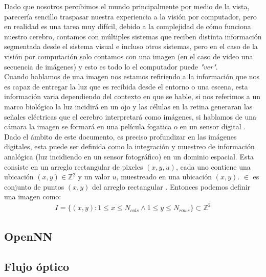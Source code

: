 \documentclass{iccmemoria}
\begin{document}
Dado que nosotros percibimos el mundo principalmente por medio de la vista, parecería sencillo traspasar nuestra experiencia a la visión por computador, pero en realidad es una tarea muy difícil, debido a la complejidad de cómo funciona nuestro cerebro, contamos con múltiples sistemas que reciben distinta información segmentada desde el sistema visual e incluso otros sistemas, pero en el caso de la visión por computación solo contamos con una imagen (en el caso de video una secuencia de imágenes) y esto es todo lo el computador puede \emph{"ver"}.\\

Cuando hablamos de una imagen nos estamos refiriendo a la información que nos es capaz de entregar la luz que es recibida desde el entorno o una escena, esta información varia dependiendo del contexto en que se hable, si nos referimos a un marco biológico la luz incidirá en un ojo y las células en la retina generaran las señales eléctricas que el cerebro interpretará como imágenes, si hablamos de una cámara la imagen se formará en una película fogatica o en un sensor digital \cite{bradski2008learning}.\\

Dado el ámbito de este documento, es preciso profundizar en las imágenes digitales, esta puede ser definida como la integración y muestreo de información analógica (luz incidiendo en un sensor fotográfico) en un dominio espacial. Esta consiste en un arreglo rectangular de pixeles $(x, y, u)$, cada uno contiene una ubicación $(x, y) \in \mathbb{Z}^2 $ y un valor $u$, muestreado en una ubicación $(x, y)$. $\in$ es conjunto de puntos $(x, y)$ del arreglo rectangular \cite{klette2014concise}. Entonces podemos definir una imagen como:\\

\begin{equation}
	\begin{split}
	I = \lbrace (x, y) : 1 \leq  x \leq N_{cols} \wedge 1 \leq y \leq N_{rows} \rbrace \subset \mathbb{Z}^2
	\end{split}
\end{equation}

\subsection{OpenNN}

\subsection{Flujo óptico}
\end{document}
